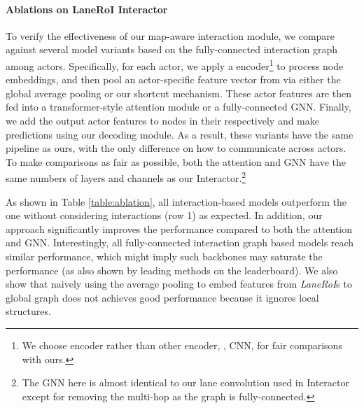 \paragraph{Ablations on LaneRoI Interactor}
To verify the effectiveness of our map-aware interaction module, we compare against several model variants based
on the fully-connected interaction graph among actors. Specifically, for each actor,
we apply a \ROI encoder\footnote{We choose \ROI encoder rather than other
encoder, \eg, CNN, for fair comparisons with ours.} to process node embeddings, and then pool an
actor-specific feature vector from \ROI via either the global average pooling or our
shortcut mechanism. These actor features are then fed into a transformer-style
\cite{transformer} attention module or a fully-connected GNN.
Finally, we add the output actor features to nodes in their \ROI respectively
and make predictions using our decoding module.
As a result, these variants have the same pipeline as ours, with the only
difference on how to communicate across actors. To make comparisons
as fair as possible, both the attention and GNN have the same
numbers of layers and channels as our \ROI Interactor.\footnote{The GNN here is almost identical to our lane
convolution used in Interactor except for removing the multi-hop as the graph is fully-connected.}

As shown in Table \ref{table:ablation}, all interaction-based models outperform
the one without considering interactions (row 1) as expected. In addition, our
approach significantly improves the performance compared to both the attention and GNN. 
Interestingly, all fully-connected interaction graph based models reach similar
performance, which might imply such backbones may saturate the performance (as
also shown by leading methods on the leaderboard).
We also show that naively using the average pooling to embed features from
\textit{LaneRoI}s to global graph does not achieves good performance
because it ignores local structures.



